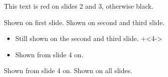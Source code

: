 \documentclass{beamer}
\begin{document}
\begin{frame}
 This text is red on slides 2 and 3, otherwise black.
\end{frame}

\begin{frame}
Shown on first slide.
Shown on second and third slide.
\begin{itemize}
\item
Still shown on the second and third slide.
\onslide+<4->
\item
Shown from slide 4 on.
\end{itemize}
Shown from slide 4 on.
\onslide
Shown on all slides.
\end{frame}

\begin{frame}
\end{frame}
\end{document}
